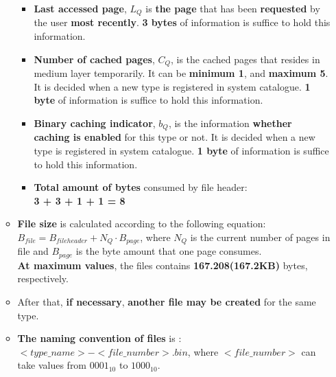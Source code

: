 \documentclass[12pt]{report}
\begin{document}
\begin{itemize}
\begin{itemize}
\begin{itemize}
\item \textbf{Last accessed page}, $L_Q$ is \textbf{the page} that has been \textbf{requested} by the user \textbf{most recently}. \textbf{3 bytes} of information is suffice to hold this information.
\item \textbf{Number of cached pages}, $C_Q$, is the cached pages that resides in medium layer temporarily. It can be \textbf{minimum 1}, and \textbf{maximum 5}. It is decided when a new type is registered in system catalogue. \textbf{1 byte} of information is suffice to hold this information.
\item \textbf{Binary caching indicator}, $b_Q$, is the information \textbf{whether caching is enabled} for this type or not. It is decided when a new type is registered in system catalogue. \textbf{1 byte} of information is suffice to hold this information.
\item \textbf{Total amount of bytes} consumed by file header: \\
\textbf{3 + 3 + 1 + 1 = 8}
\end{itemize}
\item \textbf{File size} is calculated according to the following equation: \\
{\large $B_{file} = B_{fileheader} + {N_Q}\cdot{B_{page}}$}, where $N_Q$ is the current number of pages in file and $B_{page}$ is the byte amount that one page consumes. \\
\textbf{At maximum values}, the files contains \textbf{167.208(167.2KB)} bytes, respectively.
\item After that, \textbf{if necessary}, \textbf{another file may be created} for the same type.
\item \textbf{The naming convention of files} is : \\
$<type\_name>-<file\_number>.bin$, where $<file\_number>$ can take values from $0001_{10} $ to $1000_{10}$.
\end{itemize}

\newpage


\end{itemize}
\end{document}
